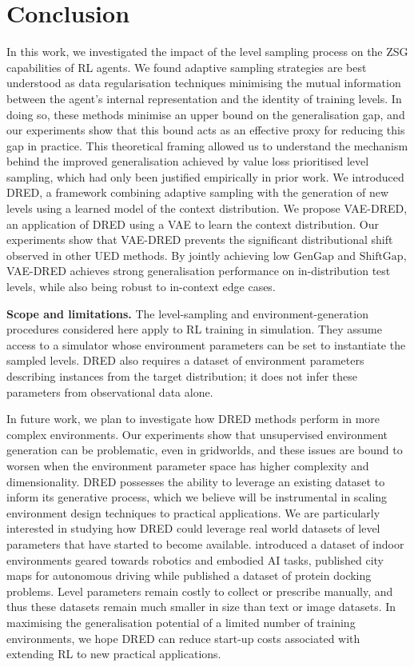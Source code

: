 \section{Conclusion}\label{c3:sec:disc}
In this work, we investigated the impact of the level sampling process on the ZSG capabilities of RL agents. We found adaptive sampling strategies are best understood as data regularisation techniques minimising the mutual information between the agent's internal representation and the identity of training levels. In doing so, these methods minimise an upper bound on the generalisation gap, and our experiments show that this bound acts as an effective proxy for reducing this gap in practice. This theoretical framing allowed us to understand the mechanism behind the improved generalisation achieved by value loss prioritised level sampling, which had only been justified empirically in prior work. We introduced DRED, a framework combining adaptive sampling with the generation of new levels using a learned model of the context distribution. We propose VAE-DRED, an application of DRED using a VAE to learn the context distribution. Our experiments show that VAE-DRED prevents the significant distributional shift observed in other UED methods. By jointly achieving low $\text{GenGap}$ and $\text{ShiftGap}$, VAE-DRED achieves strong generalisation performance on in-distribution test levels, while also being robust to in-context edge cases.

\textbf{Scope and limitations.} The level-sampling and environment-generation procedures considered here apply to RL training in simulation. They assume access to a simulator whose environment parameters can be set to instantiate the sampled levels. DRED also requires a dataset of environment parameters describing instances from the target distribution; it does not infer these parameters from observational data alone.

In future work, we plan to investigate how DRED methods perform in more complex environments. Our experiments show that unsupervised environment generation can be problematic, even in gridworlds, and these issues are bound to worsen when the environment parameter space has higher complexity and dimensionality. DRED possesses the ability to leverage an existing dataset to inform its generative process, which we believe will be instrumental in scaling environment design techniques to practical applications. We are particularly interested in studying how DRED could leverage real world datasets of level parameters that have started to become available. \citet{OpenRooms} introduced a dataset of indoor environments geared towards robotics and embodied AI tasks, \citet{argoverse2} published city maps for autonomous driving while \citet{metabox,protein_meta_opt} published a dataset of protein docking problems. Level parameters remain costly to collect or prescribe manually, and thus these datasets remain much smaller in size than text or image datasets. In maximising the generalisation potential of a limited number of training environments, we hope DRED can reduce start-up costs associated with extending RL to new practical applications.

